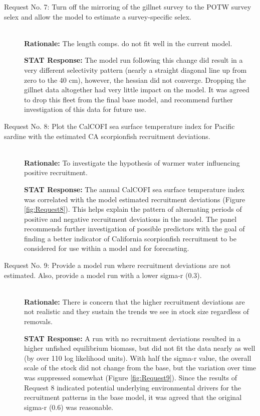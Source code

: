 \documentclass[12pt,]{article}
\begin{document}
\begin{description}
    
\item[Request No. 7: Turn off the mirroring of the gillnet survey to the POTW survey 
selex and allow the model to estimate a survey-specific selex.] \hfill \\

\textbf{Rationale:} The length comps. do not fit well in the current model. 

\textbf{STAT Response:} The model run following this change did result in a 
very different selectivity pattern (nearly a straight diagonal line up from 
zero to the 40 cm), however, the hessian did not converge. Dropping the gillnet 
data altogether had very little impact on the model. It was agreed to drop this 
fleet from the final base model, and recommend further investigation of this data 
for future use.
    
    
\item[Request No. 8: Plot the CalCOFI  sea surface temperature index for Pacific sardine 
with the estimated CA scorpionfish recruitment deviations.] \hfill \\

\textbf{Rationale:} To investigate the hypothesis of warmer water influencing positive recruitment.  
    
  
\textbf{STAT Response:} The annual CalCOFI sea surface temperature index was correlated 
with the model estimated recruitment deviations (Figure \ref{fig:Request8}). This helps 
explain the pattern of 
alternating periods of positive and negative recruitment deviations in the model. 
The panel recommends further investigation of possible predictors with the goal of 
finding a better indicator of California scorpionfish recruitment to be considered 
for use within a model and for forecasting. 
    
    
\item[Request No. 9: Provide a model run where recruitment deviations are not estimated.  
Also, provide a model run with a lower sigma-r (0.3).] \hfill \\

\textbf{Rationale:} There is concern that the higher recruitment deviations are not 
realistic and they sustain the trends we see in stock size regardless of removals.   
  
\textbf{STAT Response:} A run with no recruitment deviations resulted in a higher unfished 
equilibrium biomass, but did not fit the data nearly as well (by over 110 log likelihood units). 
With half the sigma-r value, the overall scale of the stock did not change from the base, 
but the variation over time was suppressed somewhat (Figure \ref{fig:Request9}). Since the results of Request 8 
indicated potential underlying environmental drivers for the recruitment patterns in 
the base model, it was agreed that the original sigma-r (0.6) was reasonable.  
    

\end{description}
\end{document}

